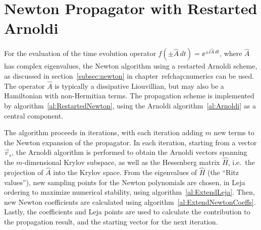 \clearpage


\section{Newton Propagator with Restarted Arnoldi}

For the evaluation of the time evolution operator
$f(\pm\hat{A}\,dt) = \ee^{\pm\ii \hat{A}\,dt}$, where $\hat{A}$ has complex
eigenvalues, the Newton algorithm using a restarted Arnoldi scheme, as discussed
in section~\ref{subsec:newton} in chapter~ref{chap:numerics} can be used. The
operator $\hat{A}$ is typically a dissipative Liouvillian, but may also be
a Hamiltonian with non-Hermitian terms. The propagation scheme is implemented by
algorithm~\ref{al:RestartedNewton}, using the Arnoldi
algorithm~\ref{al:Arnoldi} as a central component.

The algorithm proceeds in iterations, with each iteration adding $m$ new terms
to the Newton expansion of the propagator. In each iteration, starting from
a vector $\vec{v}_s$, the Arnoldi algorithm is performed to obtain the Arnoldi
vectors spanning the $m$-dimensional Krylov subspace, as well as the Hessenberg
matrix $\hat{H}$, i.e.\ the projection of $\hat{A}$ into the Krylov space. From
the eigenvalues of $\hat{H}$ (the ``Ritz values''),
new sampling points for the Newton polynomials are chosen, in Leja ordering to
maximize numerical stability, using algorithm~\ref{al:ExtendLeja}. Then, new
Newton coefficients are calculated using
algorithm~\ref{al:ExtendNewtonCoeffs}. Lastly, the coefficients and Leja points
are used to calculate the contribution to the propagation result, and the
starting vector for the next iteration.

